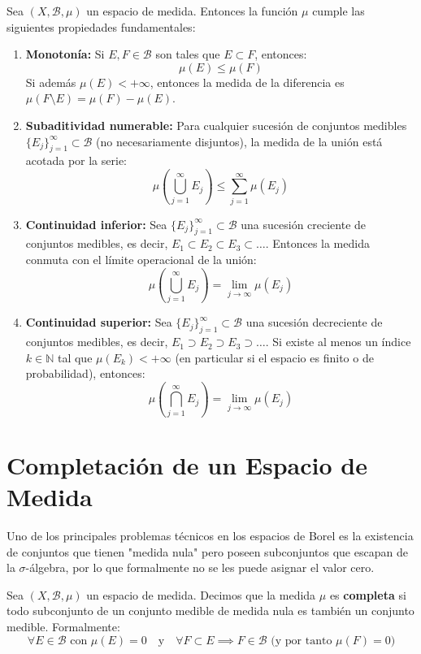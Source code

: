 \begin{teorema}
	Sea $(X, \mathcal{B}, \mu)$ un espacio de medida. Entonces la función $\mu$ cumple las siguientes propiedades fundamentales:
	\begin{enumerate}[1)]
		\item \textbf{Monotonía:} Si $E, F \in \mathcal{B}$ son tales que $E \subset F$, entonces:
		$$ \mu(E) \le \mu(F) $$
		Si además $\mu(E) < +\infty$, entonces la medida de la diferencia es $\mu(F \setminus E) = \mu(F) - \mu(E)$.
		\item \textbf{Subaditividad numerable:} Para cualquier sucesión de conjuntos medibles $\{E_j\}_{j=1}^\infty \subset \mathcal{B}$ (no necesariamente disjuntos), la medida de la unión está acotada por la serie:
		$$ \mu\left( \bigcup_{j=1}^\infty E_j \right) \le \sum_{j=1}^\infty \mu(E_j) $$
		\item \textbf{Continuidad inferior:} Sea $\{E_j\}_{j=1}^\infty \subset \mathcal{B}$ una sucesión creciente de conjuntos medibles, es decir, $E_1 \subset E_2 \subset E_3 \subset \dots$. Entonces la medida conmuta con el límite operacional de la unión:
		$$ \mu\left( \bigcup_{j=1}^\infty E_j \right) = \lim_{j \to \infty} \mu(E_j) $$
		\item \textbf{Continuidad superior:} Sea $\{E_j\}_{j=1}^\infty \subset \mathcal{B}$ una sucesión decreciente de conjuntos medibles, es decir, $E_1 \supset E_2 \supset E_3 \supset \dots$. Si existe al menos un índice $k \in \mathbb{N}$ tal que $\mu(E_k) < +\infty$ (en particular si el espacio es finito o de probabilidad), entonces:
		$$ \mu\left( \bigcap_{j=1}^\infty E_j \right) = \lim_{j \to \infty} \mu(E_j) $$
	\end{enumerate}
\end{teorema}

\section{Completación de un Espacio de Medida}

Uno de los principales problemas técnicos en los espacios de Borel es la existencia de conjuntos que tienen "medida nula" pero poseen subconjuntos que escapan de la $\sigma$-álgebra, por lo que formalmente no se les puede asignar el valor cero.

\begin{definicion}
	Sea $(X, \mathcal{B}, \mu)$ un espacio de medida. Decimos que la medida $\mu$ es \textbf{completa} si todo subconjunto de un conjunto medible de medida nula es también un conjunto medible. Formalmente:
	$$ \forall E \in \mathcal{B} \text{ con } \mu(E) = 0 \quad \text{y} \quad \forall F \subset E \implies F \in \mathcal{B} \text{ (y por tanto } \mu(F) = 0\text{)} $$
\end{definicion}

